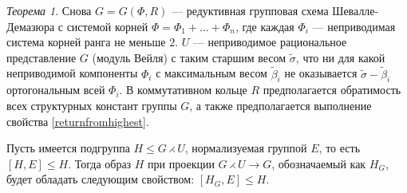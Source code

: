 \documentclass[10pt]{article}
\theoremstyle{remark}
\newtheorem{thm}{Теорема}
\renewcommand{\le}{\leqslant}
\begin{document}
\begin{thm}\label{subgroupprojectionmain}
  Снова $G = G(\Phi, R)$ --- редуктивная групповая схема Шевалле-Демазюра
  с системой корней $\Phi = \Phi_1 + \ldots + \Phi_n$, где каждая $\Phi_i$ --- неприводимая система корней ранга не меньше $2$. $U$ --- неприводимое рациональное представление $G$ (модуль Вейля) с таким старшим весом $\widetilde\sigma$, что ни для какой неприводимой компоненты $\Phi_i$ с максимальным весом $\widetilde\beta_i$ не оказывается $\widetilde\sigma-\widetilde\beta_i$ ортогональным всей $\Phi_i$. В коммутативном кольце $R$ предполагается обратимость всех структурных констант группы $G$, а также предполагается выполнение свойства \ref{returnfromhighest}.
    
  Пусть имеется подгруппа $H \le G \rightthreetimes U$, нормализуемая группой $E$, то есть $[H,E] \le H$. Тогда образ $H$ при проекции $G \rightthreetimes U \rightarrow G$, обозначаемый как $H_G$, будет обладать следующим свойством: $[H_G,E]\le H$.
\end{thm}
\end{document}
